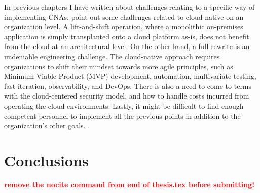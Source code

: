 \documentclass[utf8,english]{gradu3}
\newcommand{\todo}[1]{\textbf{\textcolor{red}{#1}}}
\begin{document}
In previous chapters I have written about challenges relating to a specific way
of implementing CNAs. \textcite{Patrizio2018} point out some challenges related
to cloud-native on an organization level. A lift-and-shift operation, where a
monolithic on-premises application is simply transplanted onto a cloud platform
as-is, does not benefit from the cloud at an architectural level. On the other
hand, a full rewrite is an undeniable engineering challenge. The cloud-native
approach requires organizations to shift their mindset towards more agile
principles, such as Minimum Viable Product (MVP) development, automation,
multivariate testing, fast iteration, observability, and DevOps. There is also a
need to come to terms with the cloud-centered security model, and how to handle
costs incurred from operating the cloud environments. Lastly, it might be
difficult to find enough competent personnel to implement all the previous
points in addition to the organization's other goals. \parencite{Patrizio2018}.


\chapter{Conclusions}
\label{chapter:conclusions}


\printbibliography

\nocite{*}
\todo{remove the nocite command from end of thesis.tex before submitting!}

\appendix
\end{document}
